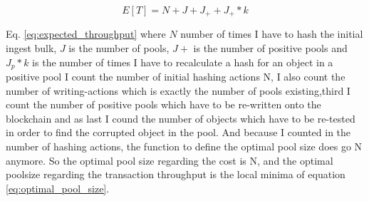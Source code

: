 \begin{equation}\label{eq:expected_throughput}
    E[T] = N + J + J_+ + J_+*k
\end{equation}

Eq. \ref{eq:expected_throughput} where $N$ number of times I have to hash the initial ingest bulk, $J$ is the number of pools, $J\plus$ is the number of positive pools and $J_p*k$ is the number of times I have to recalculate a hash for an object in a positive pool
I count the number of initial hashing actions N, I also count the number of writing-actions which is exactly the number of pools existing,third I count the number of positive pools which have to be re-written onto the blockchain and as last I cound the number of objects which have to be re-tested in order to find the corrupted object in the pool. And because I counted in the number of hashing actions, the function to define the optimal pool size does go N anymore.
So the optimal pool size regarding the cost is N, and the optimal poolsize regarding the transaction throughput is the local minima of equation \ref{eq:optimal_pool_size}.